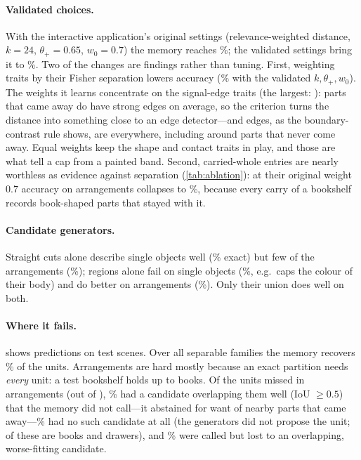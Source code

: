 \paragraph{Validated choices.} With the interactive application's original settings (relevance-weighted distance, $k=24$, $\theta_+=0.65$, $w_0=0.7$) the memory reaches \accDefault\%; the validated settings bring it to \accAll\%. Two of the changes are findings rather than tuning. First, weighting traits by their Fisher separation lowers accuracy (\accRelOn\% with the validated $k,\theta_+,w_0$). The weights it learns concentrate on the signal-edge traits (the largest: \relTop{}): parts that came away do have strong edges on average, so the criterion turns the distance into something close to an edge detector---and edges, as the boundary-contrast rule shows, are everywhere, including around parts that never come away. Equal weights keep the shape and contact traits in play, and those are what tell a cap from a painted band. Second, carried-whole entries are nearly worthless as evidence against separation (\cref{tab:ablation}): at their original weight $0.7$ accuracy on arrangements collapses to \arrCarriedSeven\%, because every carry of a bookshelf records book-shaped parts that stayed with it.

\paragraph{Candidate generators.} Straight cuts alone describe single objects well (\accCutsOnlySingle\% exact) but few of the arrangements (\arrCutsOnly\%); regions alone fail on single objects (\accRegionsOnlySingle\%, e.g.\ caps the colour of their body) and do better on arrangements (\arrRegionsOnly\%). Only their union does well on both.

\paragraph{Where it fails.}  shows predictions on test scenes. Over all separable families the memory recovers \unitsFound\% of the units. Arrangements are hard mostly because an exact partition needs \emph{every} unit: a test bookshelf holds up to \maxBooks{} books. Of the \arrMissed{} units missed in arrangements (out of \arrUnits), \missNotCalled\% had a candidate overlapping them well (IoU $\ge0.5$) that the memory did not call---it abstained for want of nearby parts that came away---\missNoCand\% had no such candidate at all (the generators did not propose the unit; \missNoCandShelf{} of these are books and \missNoCandCabinet{} drawers), and \missBadly\% were called but lost to an overlapping, worse-fitting candidate.

